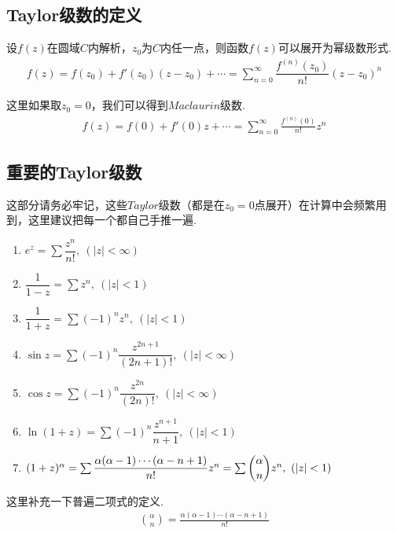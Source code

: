     \subsection{Taylor级数的定义}
        \begin{definition}[Taylor级数]\label{def:taylor_series}
            设$f(z)$在圆域$C$内解析，$z_0$为$C$内任一点，则函数$f(z)$可以展开为幂级数形式.
            \begin{align}
                f(z)=f(z_0)+f'(z_0)(z-z_0)+\cdots
                =\sum_{n=0}^{\infty}\dfrac{f^{(n)}(z_0)}{n!}(z-z_0)^n
            \end{align}
        \end{definition}
        \begin{definition}[Maclaurin级数]\label{def:maclaurin_series}
            这里如果取$z_0=0$，我们可以得到$Maclaurin$级数.
            \begin{align*}
                f(z)=f(0)+f'(0)z+\cdots=\sum_{n=0}^{\infty}\frac{f^{(n)}(0)}{n!}z^n
            \end{align*}
        \end{definition}

    \subsection{重要的Taylor级数}
        这部分请务必牢记，这些$Taylor$级数（都是在$z_0=0$点展开）在计算中会频繁用到，这里建议把每一个都自己手推一遍.
        \begin{enumerate}
            \item $e^z = \sum\dfrac{z^n}{n!},\ (|z|<\infty)$
            \item $\dfrac{1}{1-z}=\sum z^n,\ (|z|<1)$
            \item $\dfrac{1}{1+z}=\sum (-1)^n z^n,\ (|z|<1)$
            \item $\sin{z}=\sum(-1)^n\dfrac{z^{2n+1}}{(2n+1)!},\ (|z|<\infty)$
            \item $\cos{z}=\sum(-1)^n\dfrac{z^{2n}}{(2n)!},\ (|z|<\infty)$
            \item $\ln{(1+z)}=\sum(-1)^n\dfrac{z^{n+1}}{n+1},\ (|z|<1)$
            \item $(1+z)^\alpha=\sum\dfrac{\alpha(\alpha-1)\cdots(\alpha-n+1)}{n!}z^n=\sum\dbinom{\alpha}{n}z^n,\ (|z|<1)$
        \end{enumerate}

        \begin{note}
            这里补充一下普遍二项式的定义.
            \begin{align*}
                \binom{\alpha}{n}=\frac{\alpha(\alpha-1)\cdots(\alpha-n+1)}{n!}
            \end{align*}
        \end{note}

